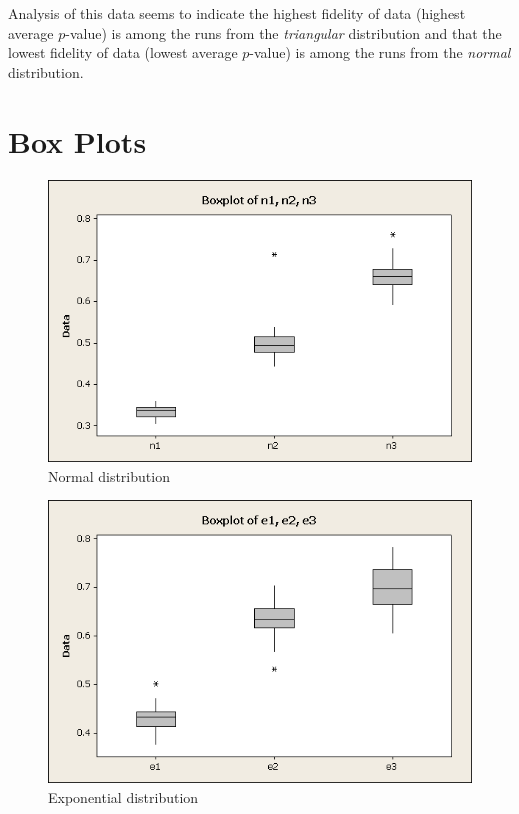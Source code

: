 \documentclass[letterpaper,10pt]{article}
\begin{document}
Analysis of this data seems to indicate the highest fidelity of data (highest average $p$-value) is among the runs from the \emph{triangular} distribution and that the lowest fidelity of data (lowest average $p$-value) is among the runs from the \emph{normal} distribution.

\pagebreak
\appendix
\section{Box Plots}
\begin{figure}[htp]
\centering
\includegraphics[scale=0.50]{n1n2n3.png}
\caption{Normal distribution}
\label{n1-3}
\end{figure}

\begin{figure}[htp]
\centering
\includegraphics[scale=0.50]{e1e2e3.png}
\caption{Exponential distribution}
\label{e1-3}
\end{figure}
\end{document}
